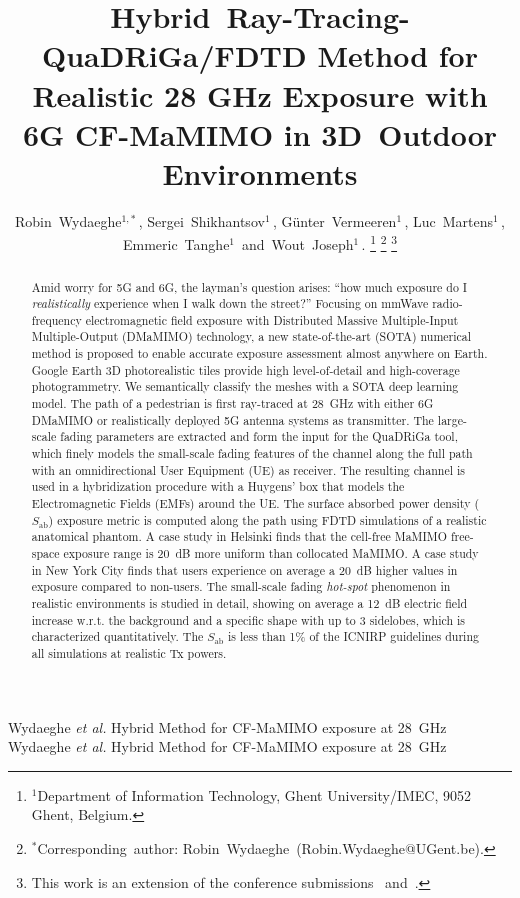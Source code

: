 \documentclass{IEEEtran}
\begin{document}
\title{Hybrid~Ray-Tracing-QuaDRiGa/FDTD Method for Realistic 28 GHz Exposure with 6G CF-MaMIMO in 3D~Outdoor Environments}

\author{Robin~Wydaeghe$^{1,*}$\,, Sergei~Shikhantsov$^1$\,, Günter~Vermeeren$^1$\,, Luc~Martens$^1$\,, Emmeric~Tanghe$^1$\, and~Wout~Joseph$^1$\,.
\thanks{$^1$Department of Information Technology, Ghent University/IMEC, 9052 Ghent, Belgium.}
\thanks{$^*$Corresponding~author: Robin~Wydaeghe~(Robin.Wydaeghe@UGent.be).}
\thanks{This work is an extension of the conference submissions~\cite{hotspots_eucap} and~\cite{QD/FDTD}.}
}

\markboth
{Wydaeghe \MakeLowercase{\textit{et al.}} Hybrid Method for CF-MaMIMO exposure at 28~GHz}
{Wydaeghe \MakeLowercase{\textit{et al.}} Hybrid Method for CF-MaMIMO exposure at 28~GHz}

\maketitle

\begin{abstract}
Amid worry for 5G and 6G, the layman's question arises: ``how much exposure do I \textit{realistically} experience when I walk down the street?'' Focusing on mmWave radio-frequency electromagnetic field exposure with Distributed Massive Multiple-Input Multiple-Output (DMaMIMO) technology, a new state-of-the-art (SOTA) numerical method is proposed to enable accurate exposure assessment almost anywhere on Earth. Google Earth 3D photorealistic tiles provide high level-of-detail and high-coverage photogrammetry. We semantically classify the meshes with a SOTA deep learning model. The path of a pedestrian is first ray-traced at 28~GHz with either 6G DMaMIMO or realistically deployed 5G antenna systems as transmitter. The large-scale fading parameters are extracted and form the input for the QuaDRiGa tool, which finely models the small-scale fading features of the channel along the full path with an omnidirectional User Equipment (UE) as receiver. The resulting channel is used in a hybridization procedure with a Huygens' box that models the Electromagnetic Fields (EMFs) around the UE. The surface absorbed power density ($S_\mathrm{ab}$) exposure metric is computed along the path using FDTD simulations of a realistic anatomical phantom. A case study in Helsinki finds that the cell-free MaMIMO free-space exposure range is 20~dB more uniform than collocated MaMIMO. A case study in New York City finds that users experience on average a 20~dB higher values in exposure compared to non-users. The small-scale fading \textit{hot-spot} phenomenon in realistic environments is studied in detail, showing on average a 12~dB electric field increase w.r.t. the background and a specific shape with up to 3 sidelobes, which is characterized quantitatively. The $S_\mathrm{ab}$ is less than 1\% of the ICNIRP guidelines during all simulations at realistic Tx powers.
\end{abstract}
\end{document}
